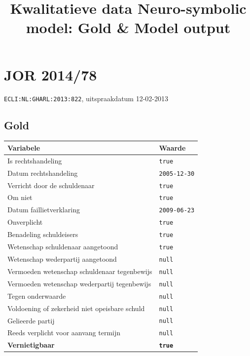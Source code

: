 \documentclass[
  dutch,
  a4paper,
]{article}
\title{Kwalitatieve data Neuro-symbolic model: Gold \& Model output}
\author{}
\date{}
\begin{document}
\maketitle

\renewcommand*\contentsname{Inhoudsopgave}
{
\setcounter{tocdepth}{3}
\tableofcontents
}
\newpage


\section{JOR 2014/78}\label{jor-201478}

\texttt{ECLI:NL:GHARL:2013:822}, uitspraakdatum 12-02-2013

\subsection{Gold}\label{gold}

\begin{center}
\small
\begin{tabular}{@{}p{8cm}p{2.6cm}@{}}
\toprule
Variabele & Waarde \\
\midrule
Is rechtshandeling & \texttt{true} \\
Datum rechtshandeling & \texttt{2005-12-30} \\
Verricht door de schuldenaar & \texttt{true} \\
Om niet & \texttt{true} \\
Datum faillietverklaring & \texttt{2009-06-23} \\
Onverplicht & \texttt{true} \\
Benadeling schuldeisers & \texttt{true} \\
Wetenschap schuldenaar aangetoond & \texttt{true} \\
Wetenschap wederpartij aangetoond & \texttt{null} \\
Vermoeden wetenschap schuldenaar tegenbewijs & \texttt{null} \\
Vermoeden wetenschap wederpartij tegenbewijs & \texttt{null} \\
Tegen onderwaarde & \texttt{null} \\
Voldoening of zekerheid niet opeisbare schuld & \texttt{null} \\
Gelieerde partij & \texttt{null} \\
Reeds verplicht voor aanvang termijn & \texttt{null} \\
\textbf{Vernietigbaar} & \textbf{\texttt{true}} \\
\bottomrule
\end{tabular}
\end{center}
\end{document}
